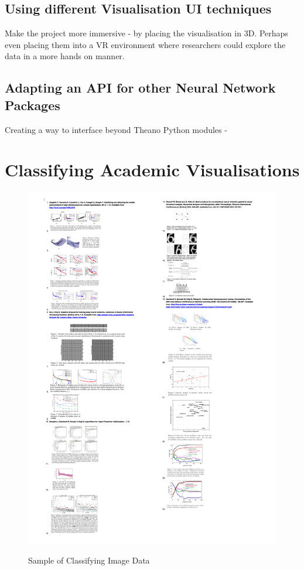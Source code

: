 \documentclass[a4paper,11pt,titlepage]{article}
\begin{document}
	\subsection{Using different Visualisation UI techniques}	

	Make the project more immersive - by placing the visualisation in 3D.
	Perhaps even placing them into a VR environment where researchers could explore the data in a more hands on manner.
		
	
	\subsection{Adapting an API for other Neural Network Packages}
	
	Creating a way to interface beyond Theano Python modules - 
	
\clearpage




\clearpage
\appendix
	\section{Classifying Academic Visualisations}
		 \begin{figure}[H]
    			\centering	
	{{\includegraphics[width=16cm]
    				{img/explanation_research_02} 
    			}}%
    			\caption{Sample of Classifying Image Data}%
    		\label{fig:studentprofile}
		\end{figure}
\end{document}
